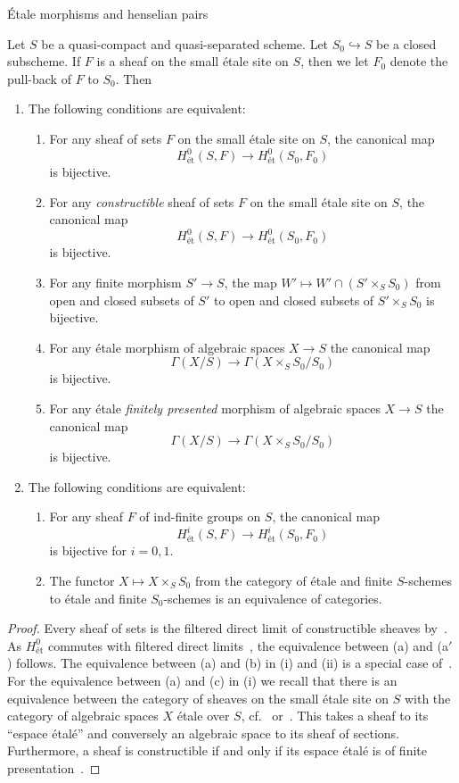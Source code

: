 \documentclass[a4paper,twoside,11pt]{amsart}[2009/07/02] %
\renewcommand{\theenumii}{{\upshape{(\alph{enumii})}}}
\newcommand{\myitemii}[1]{\renewcommand{\theenumii}{{\upshape{(#1)}}}\item}
\newcommand{\inj}{\hookrightarrow}
\newcommand{\etale}{\'{e}tale}
\newcommand{\Etale}{\'{E}tale}
\newcommand{\metale}{\text{\'et}} %
\begin{document}
\begin{section}{\Etale{} morphisms and henselian pairs}
\begin{proposition}\label{P:hensel-equiv}
Let $S$ be a quasi-compact and quasi-separated scheme. Let $S_0\inj S$
be a closed subscheme. If $F$ is a sheaf on the small \etale{} site on $S$,
then we let $F_0$ denote the pull-back of $F$ to $S_0$. Then
%
\begin{enumerate}
\item The following conditions are equivalent:
%
\begin{enumerate}
\myitemii{a} For any sheaf of sets $F$ on the small \etale{} site on $S$, the
canonical map
%
$$H^0_{\metale}(S,F)\to H^0_{\metale}(S_0,F_0)$$
%
is bijective.
\myitemii{a$'$} For any \emph{constructible} sheaf of sets $F$ on the small
\etale{} site on $S$, the canonical map
%
$$H^0_{\metale}(S,F)\to H^0_{\metale}(S_0,F_0)$$
%
is bijective.
\myitemii{b} For any finite morphism $S'\to S$, the map
$W'\mapsto W'\cap (S'\times_S S_0)$ from open and closed subsets of $S'$ to
open and closed subsets of $S'\times_S S_0$ is bijective.
\myitemii{c} For any \etale{} morphism of algebraic spaces $X\to S$ the
canonical map
%
$$\Gamma(X/S)\to \Gamma(X\times_S S_0/S_0)$$
%
is bijective.
\myitemii{c$'$} For any \etale{} \emph{finitely presented} morphism of
algebraic spaces $X\to S$ the canonical map
%
$$\Gamma(X/S)\to \Gamma(X\times_S S_0/S_0)$$
%
is bijective.
\end{enumerate}
%
\item The following conditions are equivalent:
%
\begin{enumerate}
\item For any sheaf $F$ of ind-finite groups on $S$, the canonical map
%
$$H^i_{\metale}(S,F)\to H^i_{\metale}(S_0,F_0)$$
%
is bijective for $i=0,1$.
\item The functor $X\mapsto X\times_{S} S_0$ from the category of \etale{} and
finite $S$-schemes to \etale{} and finite $S_0$-schemes is an equivalence of
categories.
\end{enumerate}
%
\end{enumerate}
%
\end{proposition}
\begin{proof}
Every sheaf of sets is the filtered direct limit of constructible
sheaves by~\cite[Exp.~IX, Cor.~2.7.2]{sga4}.
As $H^0_{\metale}$ commutes with filtered direct
limits~\cite[Exp.~VII, Rem.~5.14]{sga4},
the equivalence between (a) and (a$'$) follows. The equivalence between (a) and
(b) in (i) and (ii) is a special case of~\cite[Exp.~XII, Prop.~6.5]{sga4}.
For the equivalence between (a) and (c) in (i) we recall that there is an
equivalence between the category of sheaves on the small \etale{} site on $S$
with the category of algebraic spaces $X$ \etale{} over $S$, cf.~\cite[Ch.~V,
Thm.~1.5]{milne_etale_coh} or~\cite[Ch.~VII, \S1]{artin_theoremes_de_repr}.
This takes a sheaf to its ``espace \'{e}tal\'{e}'' and conversely an algebraic
space to its sheaf of sections. Furthermore, a sheaf is constructible if and
only if its espace \'{e}tal\'{e} is of finite
presentation~\cite[Exp.~IX, Cor.~2.7.1]{sga4}.


\end{proof}
\end{section}
\end{document}
